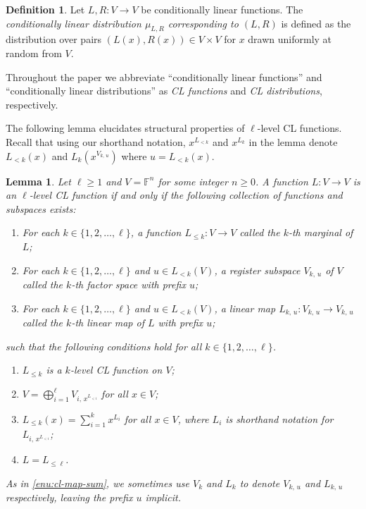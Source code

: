 \documentclass[11pt]{article}
\newtheorem{lemma}[theorem]{Lemma}
\theoremstyle{definition}
\newtheorem{definition}[theorem]{Definition}
\newcommand{\F}{\ensuremath{\mathbb{F}}}
\begin{document}
\begin{definition}
  \label{def:cl-dist}
  Let $L, R: V \to V$ be conditionally linear functions.
  The \emph{conditionally linear distribution $\mu_{L,R}$ corresponding to $(L,
    R)$} is defined as the distribution over pairs $(L(x), R(x)) \in V \times V$
  for $x$ drawn uniformly at random from $V$.
\end{definition}

Throughout the paper we abbreviate ``conditionally linear functions'' and
``conditionally linear distributions'' as \emph{CL functions} and \emph{CL
  distributions}, respectively.

The following lemma elucidates structural properties of $\ell$-level CL
functions.
Recall that using our shorthand notation, $x^{L_{<k}}$ and $x^{L_k}$ in the
lemma denote $L_{<k}(x)$ and $L_k(x^{V_{k,\, u}})$ where $u = L_{<k}(x)$.


\begin{lemma}
  \label{lem:cl-kth}
	Let $\ell \geq 1$ and $V = \F^n$ for some integer $n \geq 0$.
  A function $L: V \to V$ is an $\ell$-level CL function if and only if the
  following collection of functions and subspaces exists:
  \begin{enumerate}[label=(\roman*)]
  \item \label{enu:cl-k-marginal} For each $k \in \{1, 2, \ldots, \ell\}$, a
    function $L_{\le k} : V \to V$ called the \emph{$k$-th marginal of $L$};
  \item \label{enu:cl-k-space} For each $k \in \{1, 2, \ldots, \ell\}$ and $u
    \in L_{<k} (V)$, a register subspace $V_{k,\, u}$ of $V$ called the
    \emph{$k$-th factor space with prefix $u$};
  \item \label{enu:cl-k-map} For each $k \in \{1, 2, \ldots, \ell\}$ and $u \in
    L_{<k} (V)$, a linear map $L_{k,\, u} : V_{k,\, u} \to V_{k,\, u}$ called
    the \emph{$k$-th linear map of $L$ with prefix $u$};
  \end{enumerate}
  such that the following conditions hold for all $k \in \{1, 2, \ldots,
  \ell\}$.
  \begin{enumerate}
  \item \label{enu:cl-k-cl} $L_{\leq k}$ is a $k$-level CL function on $V$;
	\item \label{enu:cl-space-sum} $V = \bigoplus_{i = 1}^\ell V_{i,\,
      x^{L_{<i}}}$ for all $x \in V$;
  \item \label{enu:cl-map-sum} $L_{\leq k}(x) = \sum_{i = 1}^{k} x^{L_i}$ for
    all $x \in V$, where $L_i$ is shorthand notation for $L_{i,\,
      x^{L_{<i}}}$;
  \item \label{enu:cl-last-ell} $L = L_{\leq \ell}$.
  \end{enumerate}
  As in \cref{enu:cl-map-sum}, we sometimes use $V_k$ and $L_k$ to denote
  $V_{k,\, u}$ and $L_{k,\, u}$ respectively, leaving the prefix $u$ implicit.
\end{lemma}
\end{document}
